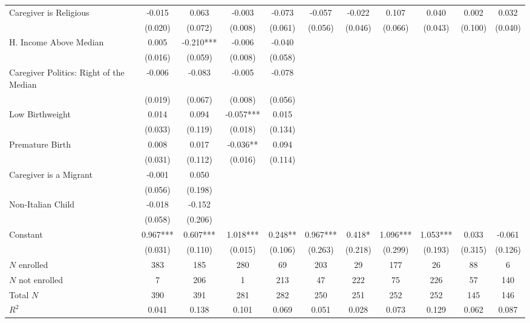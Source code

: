 \begin{tabular}{lcccccccccc}
Caregiver is Religious & -0.015 & 0.063 & -0.003 & -0.073 & -0.057 & -0.022 & 0.107 & 0.040 & 0.002 & 0.032 \\
 & (0.020) & (0.072) & (0.008) & (0.061) & (0.056) & (0.046) & (0.066) & (0.043) & (0.100) & (0.040) \\
H. Income Above Median & 0.005 & -0.210*** & -0.006 & -0.040 &  &  &  &  &  &  \\
 & (0.016) & (0.059) & (0.008) & (0.058) &  &  &  &  &  &  \\
Caregiver Politics: Right of the Median & -0.006 & -0.083 & -0.005 & -0.078 &  &  &  &  &  &  \\
 & (0.019) & (0.067) & (0.008) & (0.056) &  &  &  &  &  &  \\
Low Birthweight & 0.014 & 0.094 & -0.057*** & 0.015 &  &  &  &  &  &  \\
 & (0.033) & (0.119) & (0.018) & (0.134) &  &  &  &  &  &  \\
Premature Birth & 0.008 & 0.017 & -0.036** & 0.094 &  &  &  &  &  &  \\
 & (0.031) & (0.112) & (0.016) & (0.114) &  &  &  &  &  &  \\
Caregiver is a Migrant & -0.001 & 0.050 &  &  &  &  &  &  &  &  \\
 & (0.056) & (0.198) &  &  &  &  &  &  &  &  \\
Non-Italian Child & -0.018 & -0.152 &  &  &  &  &  &  &  &  \\
 & (0.058) & (0.206) &  &  &  &  &  &  &  &  \\
Constant & 0.967*** & 0.607*** & 1.018*** & 0.248** & 0.967*** & 0.418* & 1.096*** & 1.053*** & 0.033 & -0.061 \\
 & (0.031) & (0.110) & (0.015) & (0.106) & (0.263) & (0.218) & (0.299) & (0.193) & (0.315) & (0.126) \\
\midrule
$N$ enrolled & 383 & 185 & 280 & 69 & 203 & 29 & 177 & 26 & 88 & 6 \\
$N$ not enrolled & 7 & 206 & 1 & 213 & 47 & 222 & 75 & 226 & 57 & 140 \\
Total $N$ & 390 & 391 & 281 & 282 & 250 & 251 & 252 & 252 & 145 & 146 \\
$R^2$ & 0.041 & 0.138 & 0.101 & 0.069 & 0.051 & 0.028 & 0.073 & 0.129 & 0.062 & 0.087 \\  
 \bottomrule
\end{tabular}
